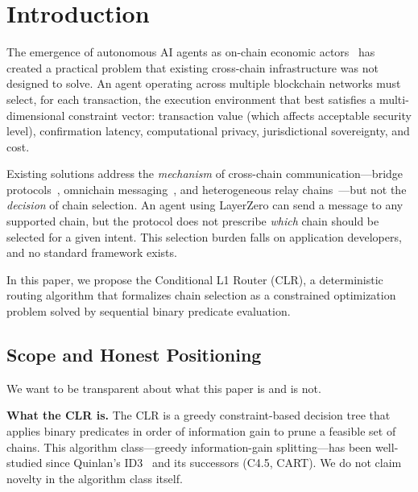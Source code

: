 \documentclass[conference, 10pt, twocolumn]{IEEEtran}
\begin{document}
\section{Introduction}
\label{sec:introduction}

The emergence of autonomous AI agents as on-chain economic
actors~\cite{wooldridge1995intelligent, park2023generative} has created
a practical problem that existing cross-chain infrastructure was not
designed to solve.  An agent operating across multiple blockchain
networks must select, for each transaction, the execution environment
that best satisfies a multi-dimensional constraint vector: transaction
value (which affects acceptable security level), confirmation latency,
computational privacy, jurisdictional sovereignty, and cost.

Existing solutions address the \emph{mechanism} of cross-chain
communication---bridge protocols~\cite{zamyatin2021crosschain},
omnichain messaging~\cite{zarick2021layerzero, hyperlane2023docs},
and heterogeneous relay chains~\cite{wood2016polkadot,
kwon2019cosmos}---but not the \emph{decision} of chain selection.  An
agent using LayerZero can send a message to any supported chain, but
the protocol does not prescribe \emph{which} chain should be selected
for a given intent.  This selection burden falls on application
developers, and no standard framework exists.

In this paper, we propose the Conditional L1 Router (CLR), a
deterministic routing algorithm that formalizes chain selection as a
constrained optimization problem solved by sequential binary predicate
evaluation.

\subsection{Scope and Honest Positioning}

We want to be transparent about what this paper is and is not.

\textbf{What the CLR is.}  The CLR is a greedy constraint-based
decision tree that applies binary predicates in order of information
gain to prune a feasible set of chains.  This algorithm class---greedy
information-gain splitting---has been well-studied since Quinlan's
ID3~\cite{quinlan1986induction} and its successors (C4.5, CART).  We
do not claim novelty in the algorithm class itself.
\end{document}

